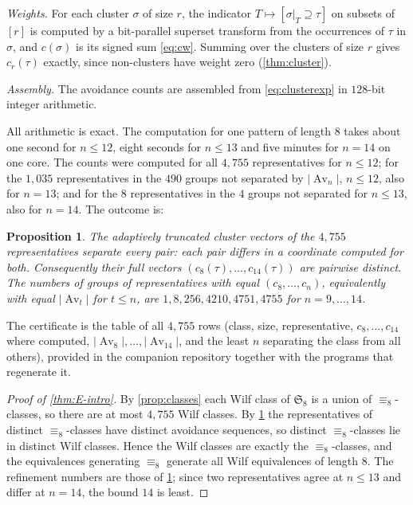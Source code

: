 \documentclass[11pt,reqno]{amsart}
\theoremstyle{plain}
\newtheorem{proposition}[proposition]{Proposition}
\theoremstyle{definition}
\theoremstyle{remark}
\newcommand{\Av}{\operatorname{Av}}
\newcommand{\bb}[1]{\left[#1\right]}
\newcommand{\Sym}{\mathfrak{S}}
\begin{document}
\emph{Weights.} For each cluster $\sigma$ of size $r$, the indicator $T\mapsto\bb{\sigma|_T\supseteq\tau}$ on subsets of $[r]$ is computed by a bit-parallel superset transform from the occurrences of $\tau$ in $\sigma$, and $c(\sigma)$ is its signed sum \eqref{eq:cw}. Summing over the clusters of size $r$ gives $c_r(\tau)$ exactly, since non-clusters have weight zero (\cref{thm:cluster}).

\emph{Assembly.} The avoidance counts are assembled from \eqref{eq:clusterexp} in $128$-bit integer arithmetic.

All arithmetic is exact. The computation for one pattern of length $8$ takes about one second for $n\le12$, eight seconds for $n\le13$ and five minutes for $n=14$ on one core. The counts were computed for all $4{,}755$ representatives for $n\le12$; for the $1{,}035$ representatives in the $490$ groups not separated by $|\Av_n|$, $n\le12$, also for $n=13$; and for the $8$ representatives in the $4$ groups not separated for $n\le13$, also for $n=14$. The outcome is:

\begin{proposition}\label{prop:separation}
The adaptively truncated cluster vectors of the $4{,}755$
representatives separate every pair: each pair differs in a coordinate
computed for both. Consequently their full vectors
$(c_8(\tau),\dots,c_{14}(\tau))$ are pairwise distinct. The numbers of groups of representatives with equal $(c_8,\dots,c_n)$, equivalently with equal $|\Av_t|$ for $t\le n$, are $1,8,256,4210,4751,4755$ for $n=9,\dots,14$.
\end{proposition}

The certificate is the table of all $4{,}755$ rows (class, size, representative, $c_8,\dots,c_{14}$ where computed, $|\Av_8|,\dots,|\Av_{14}|$, and the least $n$ separating the class from all others), provided in the companion repository together with the programs that regenerate it.

\begin{proof}[Proof of \cref{thm:E-intro}]
By \cref{prop:classes} each Wilf class of $\Sym_8$ is a union of $\equiv_8$-classes, so there are at most $4{,}755$ Wilf classes. By \cref{prop:separation} the representatives of distinct $\equiv_8$-classes have distinct avoidance sequences, so distinct $\equiv_8$-classes lie in distinct Wilf classes. Hence the Wilf classes are exactly the $\equiv_8$-classes, and the equivalences generating $\equiv_8$ generate all Wilf equivalences of length $8$. The refinement numbers are those of \cref{prop:separation}; since two representatives agree at $n\le13$ and differ at $n=14$, the bound $14$ is least.
\end{proof}
\end{document}

